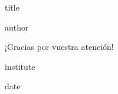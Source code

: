 \documentclass[10pt]{beamer}
\begin{document}
	\begin{frame}
		\vbox{}
		\vspace{0.25em}
		\begin{centering}
			{\inserttitlegraphic\par}
			\vspace{0.5em}
			\begin{beamercolorbox}[sep=8pt,center,rounded=true]{title}
				\inserttitle\par%
				\ifx\insertsubtitle\@empty%
				\else%
				\vspace{0.25em}
				{\insertsubtitle\par}%
				\fi%
			\end{beamercolorbox}%
			\vfill
			\begin{beamercolorbox}[sep=8pt,center]{author}
				\insertauthor
			\end{beamercolorbox}
			\vspace{0.5em}
			{\Large\textcolor{UDCpink}{¡Gracias por vuestra atención!}\par}
			\vspace{0.5em}
			\begin{beamercolorbox}[sep=8pt,center]{institute}
				\insertinstitute
			\end{beamercolorbox}
			\begin{beamercolorbox}[sep=8pt,right]{date}
				\itshape{}\insertdate
			\end{beamercolorbox}
		\end{centering}
		\vspace{0.25em}
	\end{frame}
\end{document}
